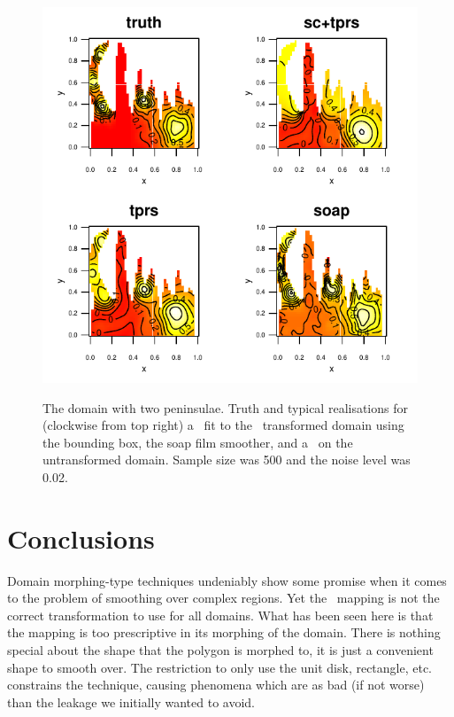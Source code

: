 \begin{figure}
\centering
\includegraphics[width=6in]{sc/figs/wigglytop2-bbox-real.pdf} \\
\caption{The domain with two peninsulae. Truth and typical realisations for (clockwise from top right) a \tprs\ fit to the \sch\ transformed domain using the bounding box, the soap film smoother, and a \tprs\ on the untransformed domain. Sample size was 500 and the noise level was 0.02.}
\label{wigglytop2-bbox-real}
\end{figure}


\section{Conclusions}
\label{sc-conclusions}

Domain morphing-type techniques undeniably show some promise when it comes to the problem of smoothing over complex regions. Yet the \sch\ mapping is not the correct transformation to use for  all domains. What has been seen here is that the mapping is too prescriptive in its morphing of the domain. There is nothing special about the shape that the polygon is morphed to, it is just a convenient shape to smooth over. The restriction to only use the unit disk, rectangle, etc. constrains the technique, causing phenomena which are as bad (if not worse) than the leakage we initially wanted to avoid.

